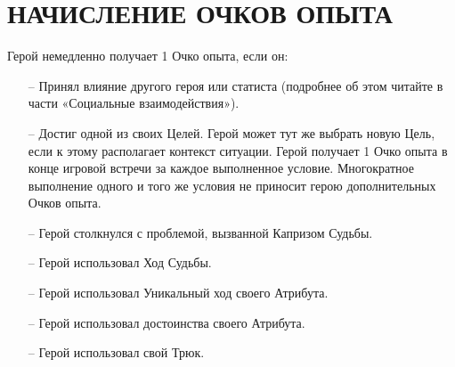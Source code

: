 \section{НАЧИСЛЕНИЕ ОЧКОВ ОПЫТА}
Герой немедленно получает 1 Очко опыта, если он:
\begin{itemize}
\item[--] Принял влияние другого героя или статиста (подробнее об этом читайте в части «Социальные взаимодействия»).
\item[--] Достиг одной из своих Целей. Герой может тут же выбрать новую Цель, если к этому располагает контекст ситуации. Герой получает 1 Очко опыта в конце игровой встречи за каждое выполненное условие. Многократное выполнение одного и того же условия не приносит герою дополнительных Очков опыта.
\item[--] Герой столкнулся с проблемой, вызванной Капризом Судьбы.
\item[--] Герой использовал Ход Судьбы.
\item[--] Герой использовал Уникальный ход своего Атрибута.
\item[--] Герой использовал достоинства своего Атрибута.
\item[--] Герой использовал свой Трюк.
\end{itemize}


